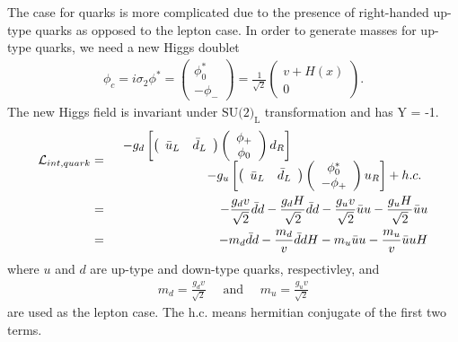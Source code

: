 The case for quarks is more complicated due to the presence of right-handed up-type 
quarks as opposed to the lepton case. In order to generate masses for up-type 
quarks, we need a new Higgs doublet 
\begin{eqnarray} 
\phi_c 
= i \sigma_2 \phi^* 
=  \left(  \begin{array}{c} \phi_0^* \\ -\phi_- \end{array} \right) 
=  \frac{1}{\sqrt{2}} \left(  \begin{array}{c} v + H(x) \\ 0 \end{array} \right). 
\end{eqnarray} 
The new Higgs field is invariant under $\textrm{SU(2)}_\textrm{L}$ transformation and has Y = -1. 
\begin{eqnarray} 
\mathcal{L}_{int, quark} 
&=& 
\begin{array}{ccc} \multicolumn{2}{c}{\displaystyle 
-g_{d} \left[ 
\left(  \begin{array}{cc} \bar{u}_L & \bar{d}_L \end{array} \right)
\left(  \begin{array}{c} \phi_+  \\ \phi_0 \end{array} \right) d_R  \right]
} & \\ & \multicolumn{2}{c}{\hspace{2cm} \displaystyle
-g_{u} \left[ 
\left(  \begin{array}{cc} \bar{u}_L & \bar{d}_L \end{array} \right)
\left(  \begin{array}{c} \phi_0^*  \\ -\phi_+ \end{array} \right) u_R  \right] 
+ h.c. 
} \end{array}   \\ 
&=&  
-\frac{g_d v}{\sqrt{2}} \bar{d}d - \frac{g_d H}{\sqrt{2}} \bar{d}d  
-\frac{g_u v}{\sqrt{2}} \bar{u}u - \frac{g_u H}{\sqrt{2}} \bar{u}u \\
&=&  
- m_d \bar{d}d  -\frac{m_d}{v} \bar{d}d H
- m_u \bar{u}u  -\frac{m_u}{v} \bar{u}u H
\end{eqnarray} 
where $u$ and $d$ are up-type and down-type quarks, respectivley, and   
\begin{eqnarray} 
m_d = \frac{g_d v}{\sqrt{2}} \quad \textrm{ and } \quad   
m_u = \frac{g_u v}{\sqrt{2}}
\end{eqnarray} 
are used as the lepton case. The h.c. means hermitian conjugate of the first two terms. 

